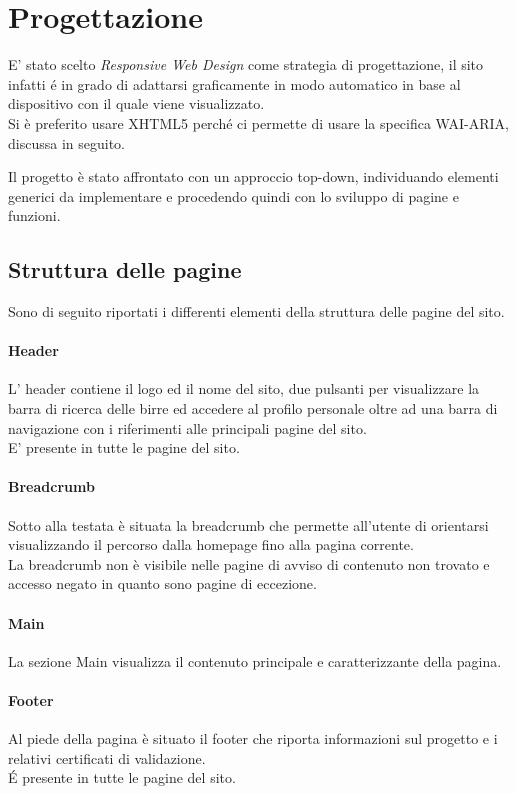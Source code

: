\section{Progettazione}
E' stato scelto \textit{Responsive Web Design} come strategia di progettazione, il sito infatti é in grado di adattarsi graficamente in modo automatico in base al dispositivo con il quale viene visualizzato. \\
Si è preferito usare  XHTML5  perché  ci  permette  di  usare  la  specifica  WAI-ARIA, discussa in seguito.

Il progetto è stato affrontato con un approccio top-down, individuando elementi generici da implementare e procedendo quindi con lo sviluppo di pagine e funzioni.


\subsection{Struttura delle pagine}
Sono di seguito riportati i differenti elementi della struttura delle pagine del sito.
\paragraph{Header}
L' header contiene il logo ed il nome del sito, due pulsanti per visualizzare la barra di ricerca delle birre ed accedere al profilo personale oltre ad una barra di navigazione con i riferimenti alle principali pagine del sito.\\
E' presente in tutte le pagine del sito.
\paragraph{Breadcrumb}
Sotto alla testata è situata la breadcrumb che permette all'utente di orientarsi visualizzando il percorso dalla homepage fino alla pagina corrente.\\
La breadcrumb non è visibile nelle pagine di avviso di contenuto non trovato e accesso negato in quanto sono pagine di eccezione.
\paragraph{Main}
La sezione Main visualizza il contenuto principale e caratterizzante della pagina.
\paragraph{Footer}
Al piede della pagina è situato il footer che riporta informazioni sul progetto e i relativi certificati di validazione.\\
\'E presente in tutte le pagine del sito.

